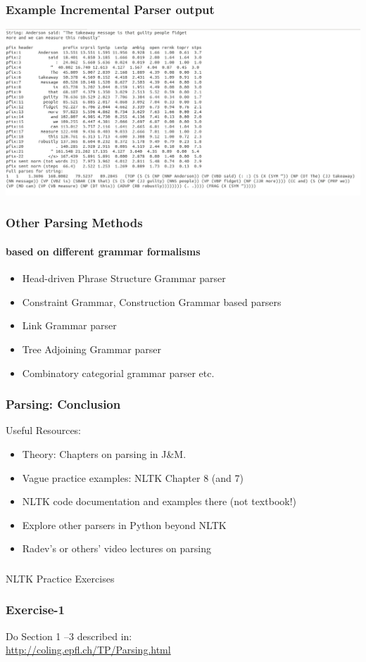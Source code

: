 \documentclass{beamer}
\begin{document}
\begin{frame}
\frametitle{Example Incremental Parser output}
\includegraphics[width=\textwidth]{Roark-Output.png}
\end{frame}

\begin{frame}
\frametitle{Other Parsing Methods}
\framesubtitle{based on different grammar formalisms}
\begin{itemize}
\item Head-driven Phrase Structure Grammar parser
\item Constraint Grammar, Construction Grammar based parsers
\item Link Grammar parser
\item Tree Adjoining Grammar parser
\item Combinatory categorial grammar parser etc.
\end{itemize}
\end{frame}

\begin{frame}
\frametitle{Parsing: Conclusion}
Useful Resources:
\begin{itemize}
\item Theory: Chapters on parsing in J\&M.
\item Vague practice examples: NLTK Chapter 8 (and 7)
\item NLTK code documentation and examples there (not textbook!) 
\item Explore other parsers in Python beyond NLTK
\item Radev's or others' video lectures on parsing
\end{itemize}
\end{frame}

\begin{frame}
\frametitle{}
\Large NLTK Practice Exercises
\end{frame}

\begin{frame}
\frametitle{Exercise-1}
Do Section 1 --3 described in: \\
\url{http://coling.epfl.ch/TP/Parsing.html}
\end{frame}
\end{document}
